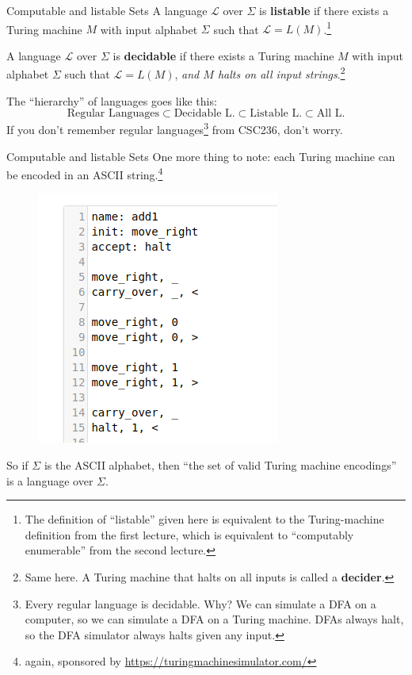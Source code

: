 \documentclass{beamer}
\begin{document}
\begin{frame}{Computable and listable Sets}
A language $\mathcal L$ over $\Sigma$ is \textbf{listable} if there exists a Turing machine $M$ with input alphabet $\Sigma$ such that $\mathcal L = L(M)$.\footnote{The definition of ``listable'' given here is equivalent to the Turing-machine definition from the first lecture, which is equivalent to ``computably enumerable'' from the second lecture.}

\vspace{2mm}

A language $\mathcal L$ over $\Sigma$ is \textbf{decidable} if there exists a Turing machine $M$ with input alphabet $\Sigma$ such that $\mathcal L = L(M)$, \textit{and $M$ halts on all input strings}.\footnote{Same here. A Turing machine that halts on all inputs is called a \textbf{decider}.}

The ``hierarchy'' of languages goes like this:
$$\text{Regular Languages} \subset \text{Decidable L.} \subset \text{Listable L.} \subset \text{All L.}$$
If you don't remember regular languages\footnote{Every regular language is decidable. Why? We can simulate a DFA on a computer, so we can simulate a DFA on a Turing machine. DFAs always halt, so the DFA simulator always halts given any input.} from CSC236, don't worry.

\end{frame}

\begin{frame}{Computable and listable Sets}
One more thing to note: each Turing machine can be encoded in an ASCII string.\footnote{again, sponsored by \url{https://turingmachinesimulator.com/}}

\begin{figure}[h]
\includegraphics[scale=0.4]{img/ss1.png}
\end{figure}

So if $\Sigma$ is the ASCII alphabet, then ``the set of valid Turing machine encodings'' is a language over $\Sigma$.

\end{frame}
\end{document}
